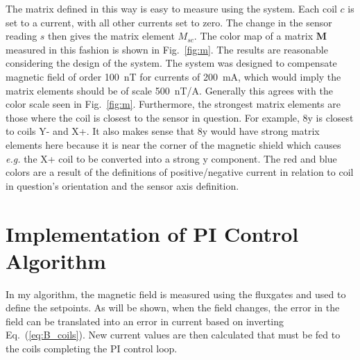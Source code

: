 The matrix defined in this way is easy to measure using the system.  Each coil $c$ is set to a current, with all other currents set to zero.  The change in the sensor reading $s$ then gives the matrix element $M_{sc}$. The color map of a matrix $\bm{M}$ measured in this fashion is shown in Fig.~\ref{fig:m}.  The results are reasonable considering the design of the system.  The system was designed to compensate magnetic field of order 100~nT for currents of 200~mA, which would imply the matrix elements should be of scale 500~nT/A.  Generally this agrees with the color scale seen in Fig.~\ref{fig:m}.  Furthermore, the strongest matrix elements are those where the coil is closest to the sensor in question.  For example, 8y is closest to coils Y- and X+.  It also makes sense that 8y would have strong matrix elements here because it is near the corner of the magnetic shield which causes {\it e.g.} the X+ coil to be converted into a strong y component.  The red and blue colors are a result of the definitions of positive/negative current in relation to coil in question's orientation and the sensor axis definition.


\FloatBarrier

\section{Implementation of PI Control Algorithm}\label{sec:pi}
 In my algorithm, the magnetic field is measured using the fluxgates and used to define the setpoints. As will be shown, when the field changes, the error in the field can be translated into an error in current based on inverting Eq.~(\ref{eq:B_coils}). New current values are then calculated that must be fed to the coils completing the PI control loop. 


